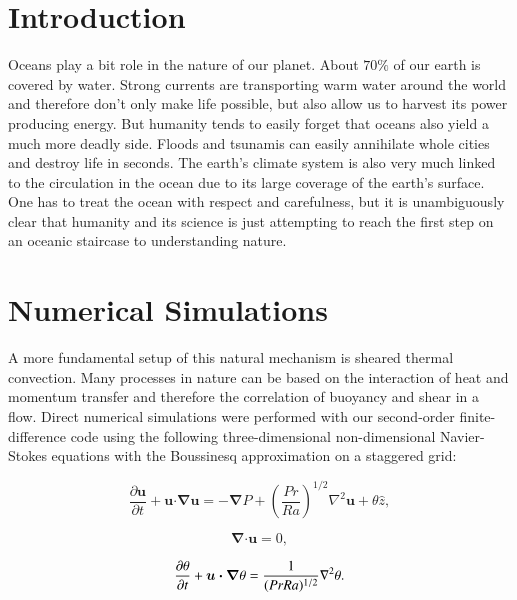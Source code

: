 \documentclass[final,5p,times,twocolumn]{elsarticle}
\begin{document}

\section{Introduction}
\label{sec:Introduction}

Oceans play a bit role in the nature of our planet. About $ 70 \% $ of our earth
is covered by water. Strong currents are transporting warm water around the world
and therefore don't only make life possible, but also allow us to harvest its
power producing energy. But humanity tends to easily forget that oceans also
yield a much more deadly side. Floods and tsunamis can easily annihilate whole
cities and destroy life in seconds. The earth's climate system is also very much
linked to the circulation in the ocean due to its large coverage of the earth's surface.
One has to treat the ocean with respect and carefulness, but it is unambiguously
clear that humanity and its science is just attempting to reach the first step on
an oceanic staircase to understanding nature.

\section{Numerical Simulations}

A more fundamental setup of this natural mechanism is sheared thermal convection.
Many processes in nature can be based on the interaction of heat and momentum
transfer and therefore the correlation of buoyancy and shear in a flow. Direct
numerical simulations were performed with our second-order finite-difference
code \cite{poe15c} using the following three-dimensional non-dimensional
Navier-Stokes equations with the Boussinesq approximation on a staggered grid:

\begin{equation} %
\frac{\partial \boldsymbol{u}}{\partial t} + \boldsymbol{u} \bm{\cdot} \bm{\nabla} \boldsymbol{u} =-\bm{\nabla} P + \left(\frac{Pr}{Ra} \right)^{1/2} \nabla^2\boldsymbol{u}+\theta \hat{z}, 
\label{eqn:NS}
\end{equation}

\begin{equation} %
\bm{\nabla} \bm{\cdot} \boldsymbol{u} =0,
\label{eqn:div}
\end{equation}

\begin{equation} %
\frac{\partial \theta}{\partial t} + \boldsymbol{u} \bm{\cdot} \bm{\nabla} \theta = \frac{1}{(Pr Ra)^{1/2}} \nabla ^2 \theta.
\label{eqn:temp} \\[8pt]
\end{equation}
\end{document}
